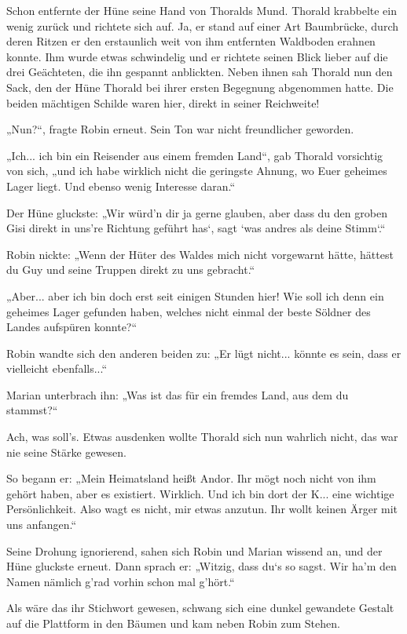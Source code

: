 Schon entfernte der Hüne seine Hand von Thoralds Mund. Thorald krabbelte ein wenig zurück und richtete sich auf. Ja, er stand auf einer Art Baumbrücke, durch deren Ritzen er den erstaunlich weit von ihm entfernten Waldboden erahnen konnte. Ihm wurde etwas schwindelig und er richtete seinen Blick lieber auf die drei Geächteten, die ihn gespannt anblickten. Neben ihnen sah Thorald nun den Sack, den der Hüne Thorald bei ihrer ersten Begegnung abgenommen hatte. Die beiden mächtigen Schilde waren hier, direkt in seiner Reichweite!

„Nun?“, fragte Robin erneut. Sein Ton war nicht freundlicher geworden.

„Ich... ich bin ein Reisender aus einem fremden Land“, gab Thorald vorsichtig von sich, „und ich habe wirklich nicht die geringste Ahnung, wo Euer geheimes Lager liegt. Und ebenso wenig Interesse daran.“

Der Hüne gluckste: „Wir würd’n dir ja gerne glauben, aber dass du den groben Gisi direkt in uns’re Richtung geführt has‘, sagt ‘was andres als deine Stimm‘.“

Robin nickte: „Wenn der Hüter des Waldes mich nicht vorgewarnt hätte, hättest du Guy und seine Truppen direkt zu uns gebracht.“

„Aber... aber ich bin doch erst seit einigen Stunden hier! Wie soll ich denn ein geheimes Lager gefunden haben, welches nicht einmal der beste Söldner des Landes aufspüren konnte?“

Robin wandte sich den anderen beiden zu: „Er lügt nicht... könnte es sein, dass er vielleicht ebenfalls...“

Marian unterbrach ihn: „Was ist das für ein fremdes Land, aus dem du stammst?“

Ach, was soll’s. Etwas ausdenken wollte Thorald sich nun wahrlich nicht, das war nie seine Stärke gewesen.

So begann er: „Mein Heimatsland heißt Andor. Ihr mögt noch nicht von ihm gehört haben, aber es existiert. Wirklich. Und ich bin dort der K... eine wichtige Persönlichkeit. Also wagt es nicht, mir etwas anzutun. Ihr wollt keinen Ärger mit uns anfangen.“

Seine Drohung ignorierend, sahen sich Robin und Marian wissend an, und der Hüne gluckste erneut. Dann sprach er: „Witzig, dass du‘s so sagst. Wir ha’m den Namen nämlich g’rad vorhin schon mal g’hört.“

Als wäre das ihr Stichwort gewesen, schwang sich eine dunkel gewandete Gestalt auf die Plattform in den Bäumen und kam neben Robin zum Stehen.

